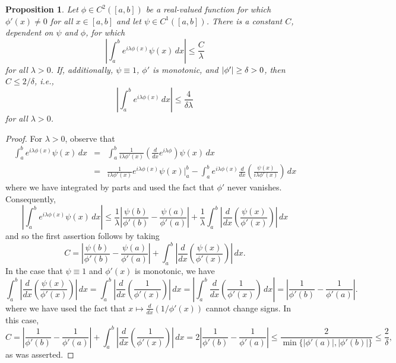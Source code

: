 \documentclass[11pt, letter]{book}
\newtheorem{proposition}[theorem]{Proposition}
\newcommand{\lp}{\left(}
\newcommand{\rp}{\right)}
\newcommand{\f}[2]{\frac{#1}{#2}}
\begin{document}
\begin{framed}
\begin{proposition}\label{prop:NoCriticalPoint}
Let $\phi\in C^2([a,b])$ be a real-valued function for which $\phi'(x)\neq 0$ for all $x\in [a,b]$ and let $\psi\in C^1([a,b])$. There is a constant $C$, dependent on $\psi$ and $\phi$, for which
\begin{equation*}
    \left|\int_a^b e^{i\lambda \phi(x)}\psi(x)\,dx \right|\leq \f{C}{\lambda}
\end{equation*}
for all $\lambda>0$. If, additionally, $\psi \equiv 1$, $\phi'$ is monotonic, and $\abs{\phi'} \geq \delta > 0$, then $C \leq 2/\delta$, i.e.,
\begin{equation*}
    \left|\int_a^b e^{i\lambda\phi(x)}\,dx\right|\leq \frac{4}{\delta\lambda}
\end{equation*}
for all $\lambda>0$.
\end{proposition}
\end{framed}
\begin{proof}
For $\lambda>0$, observe that
\begin{eqnarray*}
    \int_{a}^b e^{i\lambda \phi(x)}\psi(x)\,dx  
    &=& \int_{a}^b   \f{1}{i\lambda \phi'(x)}\lp \f{d}{dx}e^{i\lambda \phi}\rp \psi(x)  \,dx \\
    &=& \f{1}{i\lambda \phi'(x)}e^{i\lambda \phi(x)}\psi(x)\bigg\vert_{a}^b 
    - \int_{a}^b  e^{i\lambda \phi(x)} \f{d}{dx}\lp \f{\psi(x)}{i\lambda \phi'(x)} \rp \,dx 
\end{eqnarray*}
where we have integrated by parts and used the fact that $\phi'$ never vanishes. Consequently,
\begin{equation*}
    \left|\int_a^b e^{i\lambda\phi(x)}\psi(x)\,dx\right|\leq \frac{1}{\lambda}\left|\frac{\psi(b)}{\phi'(b)}-\frac{\psi(a)}{\phi'(a)}\right|+\frac{1}{\lambda}\int_a^b\left|\frac{d}{dx}\left(\frac{\psi(x)}{\phi'(x)}\right)\right|\,dx
\end{equation*}
and so the first assertion follows by taking
\begin{equation*}
    C=\left|\frac{\psi(b)}{\phi'(b)}-\frac{\psi(a)}{\phi'(a)}\right|+\int_a^b\left|\frac{d}{dx}\left(\frac{\psi(x)}{\phi'(x)}\right)\right|\,dx.
\end{equation*}
In the case that $\psi\equiv 1$ and $\phi'(x)$ is monotonic, we have
\begin{equation*}
    \int_a^b\left|\frac{d}{dx}\left(\frac{\psi(x)}{\phi'(x)}\right)\right|\,dx=\int_a^b\left|\frac{d}{dx}\left(\frac{1}{\phi'(x)}\right)\right|\,dx=\left|\int_a^b\frac{d}{dx}\left(\frac{1}{\phi'(x)}\right)\,dx\right|=\left|\frac{1}{\phi'(b)}-\frac{1}{\phi'(a)}\right|.
\end{equation*}
where we have used the fact that $x\mapsto \frac{d}{dx}(1/\phi'(x))$ cannot change signs. In this case,
\begin{equation*}
 C=\left|\frac{1}{\phi'(b)}-\frac{1}{\phi'(a)}\right|+\int_a^b\left|\frac{d}{dx}\left(\frac{1}{\phi'(x)}\right)\right|\,dx=2\left|\frac{1}{\phi'(b)}-\frac{1}{\phi'(a)}\right|\leq \frac{2}{\min\{|\phi'(a)|,|\phi'(b)|\}}\leq\frac{2}{\delta},
\end{equation*}
as was asserted.
\end{proof}
\end{document}
